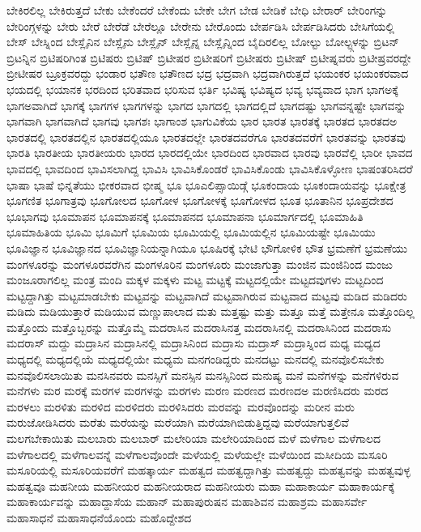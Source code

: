 {ಬೇಕಿರಲಿಲ್ಲ
ಬೇಕಿರುತ್ತದೆ
ಬೇಕು
ಬೇಕೆಂದರೆ
ಬೇಕೆಂದು
ಬೇಕೇ
ಬೇಗ
ಬೇಡ
ಬೇಡಿಕೆ
ಬೇಧಿ
ಬೇರಾರ್
ಬೇರಿಂಗನ್ನು
ಬೇರಿಂಗ್ಗಳನ್ನು
ಬೇರು
ಬೇರೆ
ಬೇರೆಡೆ
ಬೇರೆಲ್ಲೂ
ಬೇರೇನು
ಬೇರೊಂದು
ಬೇರ್ಪಡಿಸಿ
ಬೇರ್ಪಡಿಸಿದರು
ಬೇಸಿಗೆಯಲ್ಲಿ
ಬೇಸ್
ಬೇಸ್ನಿಂದ
ಬೇಸ್ಲೈನಿನ
ಬೇಸ್ಲೈನು
ಬೇಸ್ಲೈನ್
ಬೇಸ್ಲೈನ್ನ
ಬೇಸ್ಲೈನ್ನಿಂದ
ಬೈದಿರಲಿಲ್ಲ
ಬೋಲ್ಟು
ಬೋಲ್ಟ್ಗಳನ್ನು
ಬ್ರಿಟನ್
ಬ್ರಿಟನ್ನಿನ
ಬ್ರಿಟಿಷರಿಗಿಂತ
ಬ್ರಿಟಿಷರು
ಬ್ರಿಟಿಷ್
ಬ್ರಿಟೀಷರ
ಬ್ರಿಟೀಷರಿಗೆ
ಬ್ರಿಟೀಷರು
ಬ್ರಿಟೀಷ್
ಬ್ರಿಟೀಷ್ನವರು
ಬ್ರಿಟೀಷ್ರವರದ್ದೇ
ಬ್ರೀಟೀಷರ
ಬ್ರೂಕ್ರವರದ್ದು
ಭಂಡಾರ
ಭತೌಣ
ಭತೌಣದ
ಭದ್ರ
ಭದ್ರವಾಗಿ
ಭದ್ರವಾಗಿರುತ್ತದೆ
ಭಯಂಕರ
ಭಯಂಕರವಾದ
ಭಯದಲ್ಲಿ
ಭಯಾನಕ
ಭರದಿಂದ
ಭರಿತವಾದ
ಭರಿಸುವ
ಭರ್ತಿ
ಭವಿಷ್ಯ
ಭವಿಷ್ಯದ
ಭವ್ಯ
ಭವ್ಯವಾದ
ಭಾಗ
ಭಾಗಅಕ್ಕೆ
ಭಾಗಅವಾಗಿದೆ
ಭಾಗಕ್ಕೆ
ಭಾಗಗಳ
ಭಾಗಗಳನ್ನು
ಭಾಗದ
ಭಾಗದಲ್ಲಿ
ಭಾಗದಲ್ಲಿದೆ
ಭಾಗದಷ್ಟು
ಭಾಗವನ್ನಷ್ಟೇ
ಭಾಗವನ್ನು
ಭಾಗವಾಗಿ
ಭಾಗವಾಗಿದೆ
ಭಾಗವು
ಭಾಗಶಃ
ಭಾಗಾಂಶ
ಭಾಗುವಿಕೆಯ
ಭಾರ
ಭಾರತ
ಭಾರತಕ್ಕೆ
ಭಾರತದ
ಭಾರತದಅ
ಭಾರತದಲ್ಲಿ
ಭಾರತದಲ್ಲಿನ
ಭಾರತದಲ್ಲಿಯೂ
ಭಾರತದಲ್ಲೇ
ಭಾರತದವರೆಗೂ
ಭಾರತದವರೆಗೆ
ಭಾರತವನ್ನು
ಭಾರತವು
ಭಾರತಿ
ಭಾರತೀಯ
ಭಾರತೀಯರು
ಭಾರದ
ಭಾರದಲ್ಲಿಯೇ
ಭಾರದಿಂದ
ಭಾರವಾದ
ಭಾರವು
ಭಾರವೆಲ್ಲಿ
ಭಾರೀ
ಭಾವದ
ಭಾವದಲ್ಲಿ
ಭಾವದಿಂದ
ಭಾವಿಸಲಾಗಿದ್ದ
ಭಾವಿಸಿ
ಭಾವಿಸಿಕೊಂಡರೆ
ಭಾವಿಸಿಕೊಂಡು
ಭಾವಿಸಿಕೊಳ್ಳೋಣ
ಭಾಷಂತರಿಸಿದರೆ
ಭಾಷಾ
ಭಾಷೆ
ಭಿನ್ನತೆಯು
ಭೀಕರವಾದ
ಭೀಷ್ಮ
ಭೂ
ಭೂಎಲಿಪ್ಸಾಯಿಡ್ಗೆ
ಭೂಕಂದಾಯ
ಭೂಕಂದಾಯವನ್ನು
ಭೂಕ್ಷೇತ್ರ
ಭೂಗಣಿತ
ಭೂಗಾತ್ರವು
ಭೂಗೋಲದ
ಭೂಗೋಳ
ಭೂಗೋಳಕ್ಕೆ
ಭೂಗೋಳದ
ಭೂತ
ಭೂತಾನಿನ
ಭೂಪ್ರದೇಶದ
ಭೂಭಾಗವು
ಭೂಮಾಪನ
ಭೂಮಾಪನಕ್ಕೆ
ಭೂಮಾಪನದ
ಭೂಮಾಪನಾ
ಭೂಮಾರ್ಗದಲ್ಲಿ
ಭೂಮಾಹಿತಿ
ಭೂಮಾಹಿತಿಯ
ಭೂಮಿ
ಭೂಮಿಗೆ
ಭೂಮಿಯ
ಭೂಮಿಯಲ್ಲಿ
ಭೂಮಿಯಲ್ಲಿನ
ಭೂಮಿಯಷ್ಟೇ
ಭೂಮಿಯು
ಭೂವಿಜ್ಞಾನ
ಭೂವಿಜ್ಞಾನದ
ಭೂವಿಜ್ಞಾನಿಯನ್ನಾಗಿಯೂ
ಭೂಷಿರಕ್ಕೆ
ಭೇಟಿ
ಭೌಗೋಳಿಕ
ಭೌತ
ಭ್ರಮಣೆಗೆ
ಭ್ರಮಣೆಯು
ಮಂಗಳೂರನ್ನು
ಮಂಗಳೂರವರೆಗಿನ
ಮಂಗಳೂರಿನ
ಮಂಗಳೂರು
ಮಂಜಾಗುತ್ತಾ
ಮಂಜಿನ
ಮಂಜಿನಿಂದ
ಮಂಜು
ಮಂಜೂರಾಗಲಿಲ್ಲ
ಮಂತ್ರ
ಮಂದಿ
ಮಕ್ಕಳ
ಮಕ್ಕಳು
ಮಟ್ಟ
ಮಟ್ಟಕ್ಕೆ
ಮಟ್ಟದಲ್ಲಿಯೇ
ಮಟ್ಟದವುಗಳು
ಮಟ್ಟದಿಂದ
ಮಟ್ಟದ್ದಾಗಿತ್ತು
ಮಟ್ಟಮಾಡಬೇಕು
ಮಟ್ಟವನ್ನು
ಮಟ್ಟವಾಗಿದೆ
ಮಟ್ಟವಾಗಿರುವ
ಮಟ್ಟವಾದ
ಮಟ್ಟವು
ಮಡಿದ
ಮಡಿದರು
ಮಡಿದು
ಮಡಿಯುತ್ತಾರೆ
ಮಡಿಯುವ
ಮಣ್ಣುಪಾಲಾದ
ಮತು
ಮತ್ತಷ್ಟು
ಮತ್ತು
ಮತ್ತೂ
ಮತ್ತೆ
ಮತ್ತೇನೂ
ಮತ್ತೊಂದಿಲ್ಲ
ಮತ್ತೊಂದು
ಮತ್ತೊಬ್ಬರನ್ನು
ಮತ್ತೊಮ್ಮೆ
ಮದರಾಸಿನ
ಮದರಾಸಿನತ್ತ
ಮದರಾಸಿನಲ್ಲಿ
ಮದರಾಸಿನಿಂದ
ಮದರಾಸು
ಮದರಾಸ್
ಮದ್ದು
ಮದ್ರಾಸಿನ
ಮದ್ರಾಸಿನಲ್ಲಿ
ಮದ್ರಾಸಿನಿಂದ
ಮದ್ರಾಸು
ಮದ್ರಾಸ್
ಮದ್ರಾಸ್ನಿಂದ
ಮಧ್ಯ
ಮಧ್ಯದ
ಮಧ್ಯದಲ್ಲಿ
ಮಧ್ಯದಲ್ಲಿಯೆ
ಮಧ್ಯದಲ್ಲಿಯೇ
ಮಧ್ಯಮ
ಮನಗಂಡಿದ್ದರು
ಮನದಟ್ಟು
ಮನದಲ್ಲಿ
ಮನವೊಲಿಸಬೇಕು
ಮನವೊಲಿಸಲಾಯಿತು
ಮನಸಿನವರು
ಮನಸ್ಸಿಗೆ
ಮನಸ್ಸಿನ
ಮನಸ್ಸಿನಿಂದ
ಮನುಷ್ಯ
ಮನೆ
ಮನೆಗಳನ್ನು
ಮನೆಗಳಿರುವ
ಮನೆಗಳು
ಮರ
ಮರಕ್ಕೆ
ಮರಗಳ
ಮರಗಳನ್ನು
ಮರಗಳು
ಮರಣ
ಮರಣದ
ಮರಣದಅ
ಮರಣಿಸಿದರು
ಮರದ
ಮರಳಲು
ಮರಳಿತು
ಮರಳಿದ
ಮರಳಿದರು
ಮರಳಿಸಿದರು
ಮರವನ್ನು
ಮರವೊಂದನ್ನು
ಮರೀನ
ಮರು
ಮರುಜೋಡಿಸಿದರು
ಮರೆತು
ಮರೆಯನ್ನು
ಮರೆಯಾಗಿ
ಮರೆಯಾಗಿಬಿಡುತ್ತಿದ್ದವು
ಮರೆಯಾಗುತ್ತಲಿವೆ
ಮಲಗಬೇಕಾಯಿತು
ಮಲಬಾರು
ಮಲಬಾರ್
ಮಲೇರಿಯಾ
ಮಲೇರಿಯಾದಿಂದ
ಮಳೆ
ಮಳೆಗಾಲ
ಮಳೆಗಾಲದ
ಮಳೆಗಾಲದಲ್ಲಿ
ಮಳೆಗಾಲವನ್ನೆ
ಮಳೆಗಾಲವೊಂದೇ
ಮಳೆಯಲ್ಲಿ
ಮಳೆಯಲ್ಲೇ
ಮಳೆಯಿಂದ
ಮಸೀದಿಯ
ಮಸೂರಿ
ಮಸೂರಿಯಲ್ಲಿ
ಮಸೂರಿಯವರೆಗೆ
ಮಹತ್ಕಾರ್ಯ
ಮಹತ್ವದ
ಮಹತ್ವದ್ದಾಗಿತ್ತು
ಮಹತ್ವದ್ದು
ಮಹತ್ವವನ್ನು
ಮಹತ್ವವುಳ್ಳ
ಮಹತ್ವವೂ
ಮಹನೀಯ
ಮಹನೀಯರ
ಮಹನೀಯರಾದ
ಮಹನೀಯರು
ಮಹಾ
ಮಹಾಕಾರ್ಯ
ಮಹಾಕಾರ್ಯಕ್ಕೆ
ಮಹಾಕಾರ್ಯವನ್ನು
ಮಹಾದ್ದಾಸೆಯ
ಮಹಾನ್
ಮಹಾಪುರುಷನ
ಮಹಾಶಿವನ
ಮಹಾಶ್ರಮ
ಮಹಾಸರ್ವೇ
ಮಹಾಸಾಧನೆ
ಮಹಾಸಾಧನೆಯೊಂದು
ಮಹೊದ್ದೇಶದ
}
